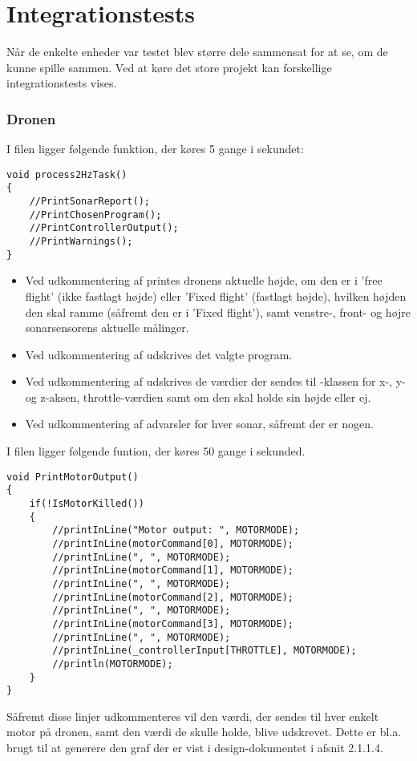 \documentclass[Main]{subfiles}
\begin{document}
\chapter{Integrationstests}

Når de enkelte enheder var testet blev større dele sammensat for at se, om de kunne spille sammen.
Ved at køre det store projekt kan forskellige integrationstests vises.

\subsection{Dronen}
I filen  ligger følgende funktion, der køres 5 gange i sekundet:

\begin{lstlisting}[caption=process2HzTask()'s integrationstest, style=Code-C, label=lst:ref]
void process2HzTask()
{
	//PrintSonarReport();
	//PrintChosenProgram();
	//PrintControllerOutput();
	//PrintWarnings();
}
\end{lstlisting}

\begin{itemize}
\item Ved udkommentering af  printes dronens aktuelle højde, om den er i 'free flight' (ikke fastlagt højde) eller 'Fixed flight' (fastlagt højde), hvilken højden den skal ramme (såfremt den er i 'Fixed flight'), samt venstre-, front- og højre sonarsensorens aktuelle målinger.

\item Ved udkommentering af  udskrives det valgte program.

\item Ved udkommentering af  udskrives de værdier der sendes til -klassen for x-, y- og z-aksen, throttle-værdien samt om den skal holde sin højde eller ej.

\item Ved udkommentering af  advarsler for hver sonar, såfremt der er nogen.
\end{itemize}


\newpage
I filen  ligger følgende funtion, der køres 50 gange i sekunded.


\begin{lstlisting}[caption=lst:PrintMotorOutput()'s integrationstest, style=Code-C, label=lst:PrintMotorOutput]
void PrintMotorOutput()
{
	if(!IsMotorKilled())
	{
		//printInLine("Motor output: ", MOTORMODE);
		//printInLine(motorCommand[0], MOTORMODE);
		//printInLine(", ", MOTORMODE);
		//printInLine(motorCommand[1], MOTORMODE);
		//printInLine(", ", MOTORMODE);
		//printInLine(motorCommand[2], MOTORMODE);
		//printInLine(", ", MOTORMODE);
		//printInLine(motorCommand[3], MOTORMODE);
		//printInLine(", ", MOTORMODE);
		//printInLine(_controllerInput[THROTTLE], MOTORMODE);
		//println(MOTORMODE);
	}
}
\end{lstlisting}

Såfremt disse linjer udkommenteres vil den værdi, der sendes til hver enkelt motor på dronen, samt den værdi de skulle holde, blive udskrevet.
Dette er bl.a. brugt til at generere den graf der er vist i design-dokumentet\cite{Design}  i afsnit 2.1.1.4.
\end{document}
